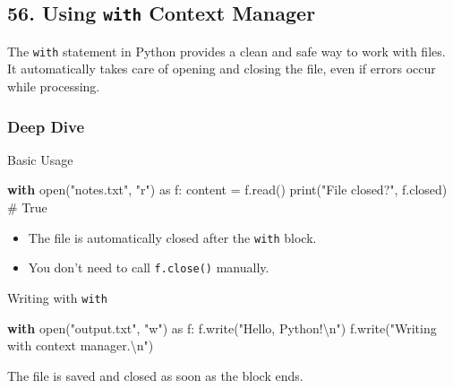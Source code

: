 \documentclass[
  letterpaper,
  DIV=11,
  numbers=noendperiod]{scrreprt}
\newenvironment{Shaded}{\begin{snugshade}}{\end{snugshade}}
\newcommand{\BuiltInTok}[1]{\textcolor[rgb]{0.00,0.23,0.31}{#1}}
\newcommand{\CharTok}[1]{\textcolor[rgb]{0.13,0.47,0.30}{#1}}
\newcommand{\CommentTok}[1]{\textcolor[rgb]{0.37,0.37,0.37}{#1}}
\newcommand{\ControlFlowTok}[1]{\textcolor[rgb]{0.00,0.23,0.31}{\textbf{#1}}}
\newcommand{\ImportTok}[1]{\textcolor[rgb]{0.00,0.46,0.62}{#1}}
\newcommand{\NormalTok}[1]{\textcolor[rgb]{0.00,0.23,0.31}{#1}}
\newcommand{\OperatorTok}[1]{\textcolor[rgb]{0.37,0.37,0.37}{#1}}
\newcommand{\StringTok}[1]{\textcolor[rgb]{0.13,0.47,0.30}{#1}}
\providecommand{\tightlist}{%
  \setlength{\itemsep}{0pt}\setlength{\parskip}{0pt}}
\begin{document}
\subsection{\texorpdfstring{56. Using \texttt{with} Context
Manager}{56. Using with Context Manager}}\label{using-with-context-manager}

The \texttt{with} statement in Python provides a clean and safe way to
work with files. It automatically takes care of opening and closing the
file, even if errors occur while processing.

\subsubsection{Deep Dive}\label{deep-dive-55}

Basic Usage

\begin{Shaded}
\begin{Highlighting}[]
\ControlFlowTok{with} \BuiltInTok{open}\NormalTok{(}\StringTok{"notes.txt"}\NormalTok{, }\StringTok{"r"}\NormalTok{) }\ImportTok{as}\NormalTok{ f:}
\NormalTok{    content }\OperatorTok{=}\NormalTok{ f.read()}
\BuiltInTok{print}\NormalTok{(}\StringTok{"File closed?"}\NormalTok{, f.closed)  }\CommentTok{\# True}
\end{Highlighting}
\end{Shaded}

\begin{itemize}
\tightlist
\item
  The file is automatically closed after the \texttt{with} block.
\item
  You don't need to call \texttt{f.close()} manually.
\end{itemize}

Writing with \texttt{with}

\begin{Shaded}
\begin{Highlighting}[]
\ControlFlowTok{with} \BuiltInTok{open}\NormalTok{(}\StringTok{"output.txt"}\NormalTok{, }\StringTok{"w"}\NormalTok{) }\ImportTok{as}\NormalTok{ f:}
\NormalTok{    f.write(}\StringTok{"Hello, Python!}\CharTok{\textbackslash{}n}\StringTok{"}\NormalTok{)}
\NormalTok{    f.write(}\StringTok{"Writing with context manager.}\CharTok{\textbackslash{}n}\StringTok{"}\NormalTok{)}
\end{Highlighting}
\end{Shaded}

The file is saved and closed as soon as the block ends.
\end{document}
